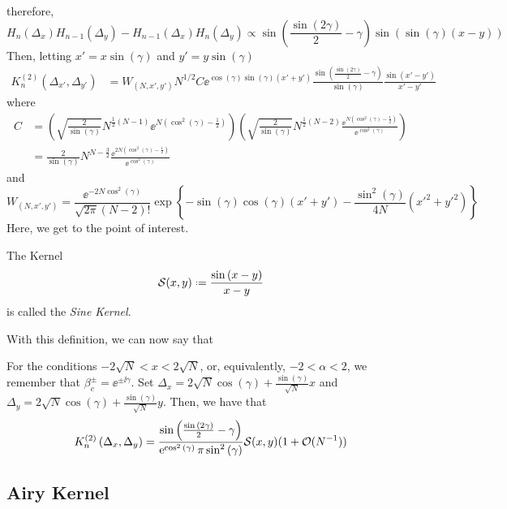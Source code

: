 therefore,
\begin{equation}
	H_n(\Delta_x)H_{n-1}(\Delta_y) - H_{n-1}(\Delta_x)H_n(\Delta_y) \propto \sin{\left(\frac{\sin{(2\gamma)}}{2}-\gamma\right)} \sin{\left( \sin{(\gamma)}(x - y) \right)}
\end{equation}
Then, letting $x' = x \sin{(\gamma)}$ and $y' = y \sin{(\gamma)}$
\begin{align}
	K_n^{(2)}(\Delta_{x'},\Delta_{y'}) & = W_{(N,x',y')} N^{1/2} C \ee^{\cos{(\gamma)}\sin{(\gamma)}(x' + y')} \frac{\sin{\left(\frac{\sin{(2\gamma)}}{2}-\gamma\right)} }{\sin{(\gamma)}}\frac{\sin{(x' - y')}}{x'-y'}
\end{align}
where
\begin{align}
	C & = \left(\sqrt{\frac{2}{\sin{(\gamma)}}}
	N^{\frac{1}{2}(N-1)}
	\ee^{N\left(\cos^2{(\gamma)} - \frac{1}{2} \right)} \right) 
	\left( \sqrt{\frac{2}{\sin{(\gamma)}}} 
	N^{\frac{1}{2}(N-2)}
	\frac{\ee^{N\left(\cos^2{(\gamma)} - \frac{1}{2} \right)}}{\ee^{\cos^2{(\gamma)} }}
	\right) \\
	& = \frac{2}{\sin{(\gamma)}}
	N^{N - \frac{3}{2}}
	\frac{\ee^{2N\left(\cos^2{(\gamma)} - \frac{1}{2} \right)}}{\ee^{\cos^2{(\gamma)}}}
\end{align}
and
\begin{equation}
	W_{(N,x',y')} = \frac{\ee^{-2N\cos^2{(\gamma)}}}{\sqrt{2\pi} (N-2)!}
	\exp{\left\{-\sin{(\gamma)}\cos{(\gamma)} (x'+y') - \frac{\sin^2{(\gamma)}}{4N} (x'^2 + y'^2) \right\}} 
\end{equation}
Here, we get to the point of interest. 
\begin{definition}
	The Kernel
	\begin{equation}
		\Sine(x, y) \deff \frac{\sin{(x  -y)}}{x - y}
	\end{equation}
	is called the \textit{Sine Kernel}.
\end{definition}
With this definition, we can now say that 
\begin{thm}
	For the conditions $-2\sqrt{N} < x < 2\sqrt{N}$, or, equivalently, $-2 < \alpha < 2$, we remember that $\beta_c^\pm = \ee^{\pm \ii \gamma}$. Set $\Delta_x = 2\sqrt{N}\cos(\gamma) + \frac{\sin{(\gamma)}}{\sqrt{N}} x$ and $\Delta_y = 2\sqrt{N}\cos(\gamma) + \frac{\sin{(\gamma)}}{\sqrt{N}} y$. Then, we have that
	\begin{equation}
	K_n^{(2)}\left(\Delta_x, \Delta_y\right) = \frac{\sin{\left(\frac{\sin{(2\gamma)}}{2}-\gamma\right)}}{\operatorname{e}^{\cos^2{(\gamma)}} \pi \sin^2{(\gamma)}} \mathcal{S}(x, y) (1 + \mathcal{O}(N^{-1}))
	\end{equation}
\end{thm}


\subsection{Airy Kernel}